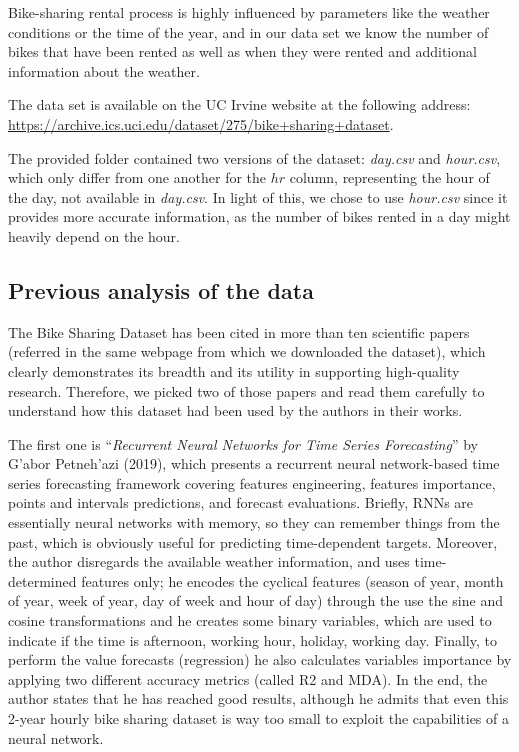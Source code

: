 \documentclass[11pt,a4paper]{article}
\begin{document}
Bike-sharing rental process is highly influenced by parameters like the weather conditions or the time of the year, and in our data set we know the number of bikes that have been rented as well as when they were rented and additional information about the weather.

The data set is available on the UC Irvine website at the following address: \url{https://archive.ics.uci.edu/dataset/275/bike+sharing+dataset}.

The provided folder contained two versions of the dataset: \textit{day.csv} and \textit{hour.csv}, which only differ from one another for the $hr$ column, representing the hour of the day, not available in \textit{day.csv}. In light of this, we chose to use \textit{hour.csv} since it provides more accurate information, as the number of bikes rented in a day might heavily depend on the hour. \\


\subsection{Previous analysis of the data}
The Bike Sharing Dataset has been cited in more than ten scientific papers (referred in the same webpage from which we downloaded the dataset), which clearly demonstrates its breadth and its utility in supporting high-quality research. Therefore, we picked two of those papers and read them carefully to understand how this dataset had been used by the authors in their works.

The first one is “\textit{Recurrent Neural Networks for Time Series Forecasting}” by G'abor Petneh'azi (2019), which presents a recurrent neural network-based time series forecasting framework covering features engineering, features importance, points and intervals predictions, and forecast evaluations. Briefly, RNNs are essentially neural networks with memory, so they can remember things from the past, which is obviously useful for predicting time-dependent targets. Moreover, the author disregards the available weather information, and uses time-determined features only; he encodes the cyclical features (season of year, month of year, week of year, day of week and hour of day) through the use the sine and cosine transformations and he creates some binary variables, which are used to indicate if the time is afternoon, working hour, holiday, working day. 
Finally, to perform the value forecasts (regression) he also calculates variables importance by applying two different accuracy metrics (called R2 and MDA). In the end, the author states that he has reached good results, although he admits that even this 2-year hourly bike sharing dataset is way too small to exploit the capabilities of a neural network.
\end{document}

